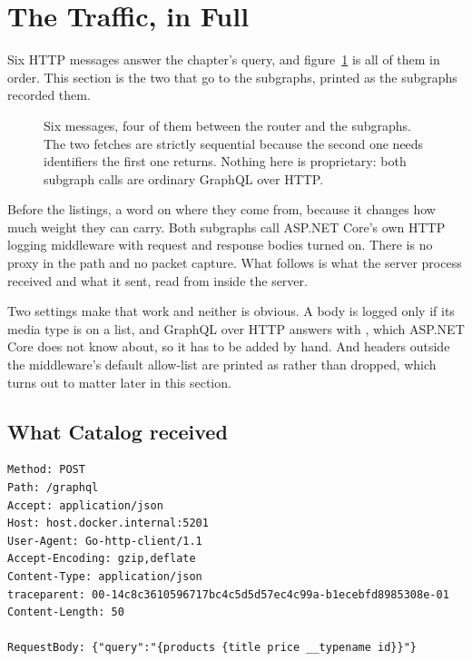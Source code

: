 \section{The Traffic, in Full}
\label{sec:ch07-the-traffic-in-full}
%

Six HTTP messages answer the chapter's query, and
figure~\ref{fig:ch07-message-sequence} is all of them in order. This section is
the two that go to the subgraphs, printed as the subgraphs recorded them.

\begin{figure}[htbp]
  \centering
  
  \caption{Six messages, four of them between the router and the subgraphs. The
  two fetches are strictly sequential because the second one needs identifiers
  the first one returns. Nothing here is proprietary: both subgraph calls are
  ordinary GraphQL over HTTP.}
  \label{fig:ch07-message-sequence}
\end{figure}

%
Before the listings, a word on where they come from, because it changes how much
weight they can carry. Both subgraphs call ASP.NET Core's own HTTP logging
middleware with request and response bodies turned on. There is no proxy in the
path and no packet capture. What follows is what the server process received and
what it sent, read from inside the server.

Two settings make that work and neither is obvious. A body is logged only if its
media type is on a list, and GraphQL over HTTP answers with
, which ASP.NET Core does not know
about, so it has to be added by hand. And headers outside the middleware's
default allow-list are printed as \code{[Redacted]} rather than dropped, which
turns out to matter later in this section.

\subsection*{What Catalog received}

\begin{verbatim}
Method: POST
Path: /graphql
Accept: application/json
Host: host.docker.internal:5201
User-Agent: Go-http-client/1.1
Accept-Encoding: gzip,deflate
Content-Type: application/json
traceparent: 00-14c8c3610596717bc4c5d5d57ec4c99a-b1ecebfd8985308e-01
Content-Length: 50

RequestBody: {"query":"{products {title price __typename id}}"}
\end{verbatim}

